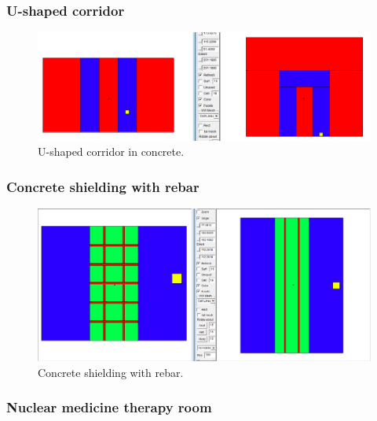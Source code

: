 \subsubsection*{U-shaped corridor}

\begin{figure}[h!]
  \centering
  \includegraphics[width=15cm]{./chapters/characterization_probs/figures/geometries/prob-2.png}
  \caption[U-shaped corridor in concrete]{U-shaped corridor in concrete.}
  \label{fig:prob2geom}
\end{figure}

\subsubsection*{Concrete shielding with rebar}

\begin{figure}[h!]
  \centering
  \includegraphics[width=15cm]{./chapters/characterization_probs/figures/geometries/prob-4.png}
  \caption[Concrete shielding with rebar]{Concrete shielding with rebar.}
  \label{fig:prob4geom}
\end{figure}

\subsubsection*{Nuclear medicine therapy room}

